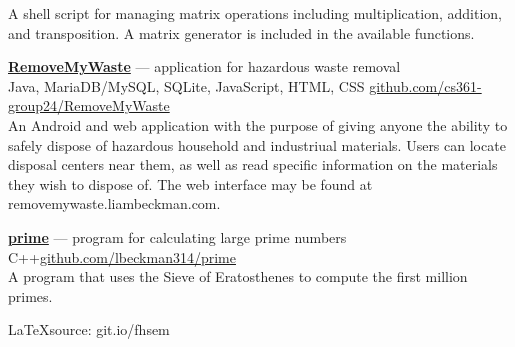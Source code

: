 \documentclass[a4paper]{article}
\begin{document}
A shell script for managing matrix operations including multiplication, addition, and transposition. A matrix generator is included in the available functions.

\textcolor{my-grey}{\dotfill}
\medbreak

\textcolor{my-blue}{\textbf{\href{https://liambeckman.com/code/matriz}{RemoveMyWaste}}} --- application for hazardous waste removal\\
\textcolor{my-grey}{Java, MariaDB/MySQL, SQLite, JavaScript, HTML, CSS \hfill \href{https://github.com/cs361-group24/RemoveMyWaste}{github.com/cs361-group24/RemoveMyWaste}}\\

An Android and web application with the purpose of giving anyone the ability to safely dispose of hazardous household and industriual materials. Users can locate disposal centers near them, as well as read specific information on the materials they wish to dispose of. The web interface may be found at \textcolor{my-blue}{removemywaste.liambeckman.com}.

\textcolor{my-grey}{\dotfill}
\medbreak

\textcolor{my-blue}{\textbf{\href{https://liambeckman.com/code/matriz}{prime}}} --- program for calculating large prime numbers\\
\textcolor{my-grey}{C++\hfill \href{https://github.com/lbeckman314/prime}{github.com/lbeckman314/prime}}\\

A program that uses the Sieve of Eratosthenes to compute the first million primes.

\textcolor{my-grey}{\dotfill}
\medbreak

\vfill
\hfill\textcolor{my-red}{\LaTeX  source: git.io/fhsem}
\end{document}
